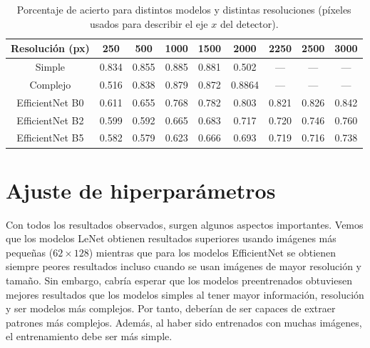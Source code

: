 \documentclass[a4paper,12pt,oneside,titlepage]{book}
\begin{document}
\begin{table}[h!]
  \centering
  \begin{tabular}{|c|c|c|c|c|c|c|c|c|}
  \hline
  Resolución (px) & 250   & 500   & 1000  & 1500  & 2000  & 2250   & 2500   & 3000    \\ \hline\hline %
  Simple          & 0.834 & 0.855 & 0.885 & 0.881 & 0.502 & ---    & ---    & ---     \\ \hline       %
  Complejo        & 0.516 & 0.838 & 0.879 & 0.872 & 0.8864 & ---    & ---    & ---     \\ \hline       %
  EfficientNet B0 & 0.611 & 0.655 & 0.768 & 0.782 & 0.803 & 0.821  & 0.826  & 0.842   \\ \hline       %
  EfficientNet B2 & 0.599 & 0.592 & 0.665 & 0.683 & 0.717 & 0.720  & 0.746  & 0.760   \\ \hline       %
  EfficientNet B5 & 0.582 & 0.579 & 0.623 & 0.666 & 0.693 & 0.719  & 0.716  & 0.738   \\ \hline       %
  \end{tabular}
  \caption{Porcentaje de acierto para distintos modelos y distintas resoluciones (píxeles usados para describir el eje $x$ del detector).}
  \label{tab:estudio_res}
\end{table}


\section{Ajuste de hiperparámetros}

Con todos los resultados observados, surgen algunos aspectos importantes. Vemos que los modelos LeNet obtienen resultados superiores usando imágenes más pequeñas ($62\times 128$) mientras que para los modelos EfficientNet se obtienen siempre peores resultados incluso cuando se usan imágenes de mayor resolución y tamaño. Sin embargo, cabría esperar que los modelos preentrenados obtuviesen mejores resultados que los modelos simples al tener mayor información, resolución y ser modelos más complejos. Por tanto, deberían de ser capaces de extraer patrones más complejos. Además, al haber sido entrenados con muchas imágenes, el entrenamiento debe ser más simple.
 
\end{document}
